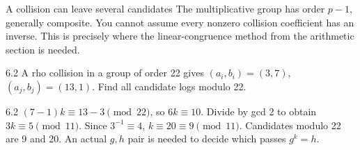 \documentclass[11pt,a4paper]{article}
\begin{document}
\begin{tip}{A collision can leave several candidates}
The multiplicative group has order \(p-1\), generally composite. You cannot assume every nonzero collision coefficient has an inverse. This is precisely where the linear-congruence method from the arithmetic section is needed.
\end{tip}
\begin{question}{6.2}
A rho collision in a group of order 22 gives \((a_i,b_i)=(3,7)\), \((a_j,b_j)=(13,1)\). Find all candidate logs modulo 22.
\end{question}
\begin{answer}{6.2}
\((7-1)k\equiv13-3\pmod{22}\), so \(6k\equiv10\). Divide by gcd 2 to obtain \(3k\equiv5\pmod{11}\). Since \(3^{-1}\equiv4\), \(k\equiv20\equiv9\pmod{11}\). Candidates modulo 22 are 9 and 20. An actual \(g,h\) pair is needed to decide which passes \(g^k=h\).
\end{answer}
\end{document}
